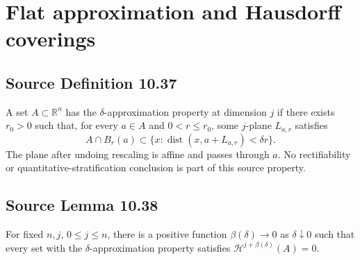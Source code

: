 \documentclass[11pt,a4paper]{article}
\numberwithin{equation}{section}
\theoremstyle{definition}
\theoremstyle{remark}
\newcommand{\R}{\mathbb R}
\newcommand{\HH}{\mathcal H}
\newcommand{\dist}{\operatorname{dist}}
\begin{document}
\section{Flat approximation and Hausdorff coverings}
\subsection{Source Definition 10.37}\label{def:flatness}
A set $A\subset\R^n$ has the $\delta$-approximation property at dimension
$j$ if there exists $r_0>0$ such that, for every $a\in A$ and
$0<r\le r_0$, some $j$-plane $L_{a,r}$ satisfies
\[
 A\cap B_r(a)\subset\{x:\dist(x,a+L_{a,r})<\delta r\}.
\]
The plane after undoing rescaling is affine and passes through $a$.
No rectifiability or quantitative-stratification conclusion is part of
this source property.

\subsection{Source Lemma 10.38}\label{lem:flat-cover}
For fixed $n,j$, $0\le j\le n$, there is a positive function
$\beta(\delta)\to0$ as $\delta\downarrow0$ such that every set with
the $\delta$-approximation property satisfies
$\HH^{j+\beta(\delta)}(A)=0$.
\end{document}

